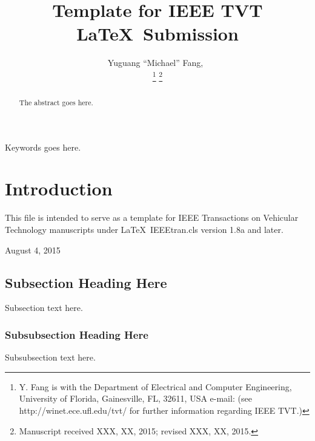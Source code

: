 \documentclass[journal,10pt]{IEEEtran}
\begin{document}
\title{Template for IEEE TVT \LaTeX\ Submission}


\author{Yuguang ``Michael'' Fang,~

\thanks{Y. Fang is with the Department of Electrical and Computer Engineering, University of Florida, Gainesville, FL, 32611, USA e-mail: (see http://winet.ece.ufl.edu/tvt/ for further information regarding IEEE TVT.)}%
\thanks{Manuscript received XXX, XX, 2015; revised XXX, XX, 2015.}}

{}







\maketitle


\begin{abstract}
The abstract goes here.
\end{abstract}


\begin{IEEEkeywords}
Keywords goes here.
\end{IEEEkeywords}


\IEEEpeerreviewmaketitle



\section{Introduction}

This file is intended to serve as a template for IEEE Transactions on Vehicular Technology manuscripts under \LaTeX\ IEEEtran.cls version 1.8a and later.


\hfill August 4, 2015

\subsection{Subsection Heading Here}
Subsection text here.



\subsubsection{Subsubsection Heading Here}
Subsubsection text here.
\end{document}
